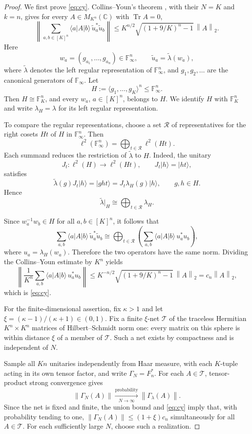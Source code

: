 \documentclass[11pt]{article}
\numberwithin{equation}{section}
\theoremstyle{boldremark}\newtheorem{remark}[theorem]{Remark}
\DeclareMathOperator{\Tr}{Tr}
\newcommand{\C}{\mathbb C}
\newcommand{\F}{\mathbb F}
\newcommand{\M}{M}
\newcommand{\norm}[1]{\left\lVert #1\right\rVert}
\newcommand{\ket}[1]{\lvert #1\rangle}
\newcommand{\bra}[1]{\langle #1\rvert}
\begin{document}
\begin{proof}
We first prove \eqref{eq:cy}. Collins--Youn's theorem
\cite[Theorem~3.3]{CY}, with their $N=K$ and $k=n$, gives
for every $A\in\M_{K^n}(\C)$ with $\Tr A=0$,
\[
 \left\|\sum_{a,b\in[K]^n}\bra a A\ket b\,
 \widetilde u_a^*\widetilde u_b\right\|
 \le K^{n/2}\sqrt{(1+9/K)^n-1}\,\norm A_2.
\]
Here
\[
 w_a=(g_{a_1},\ldots,g_{a_n})\in\F_\infty^n,
 \qquad \widetilde u_a=\widetilde\lambda(w_a),
\]
where $\widetilde\lambda$ denotes the left regular representation
of $\F_\infty^n$, and $g_1,g_2,\ldots$ are the canonical generators
of $\F_\infty$. Let
\[
 H:=\langle g_1,\ldots,g_K\rangle^n\le\F_\infty^n.
\]
Then $H\cong\F_K^n$, and every $w_a$, $a\in[K]^n$, belongs to $H$.
We identify $H$ with $\F_K^n$ and write $\lambda_H=\lambda$ for its
left regular representation.

To compare the regular representations, choose a set $\mathcal R$
of representatives for the right cosets $Ht$ of $H$ in
$\F_\infty^n$. Then
\[
 \ell^2(\F_\infty^n)
 =\bigoplus_{t\in\mathcal R}\ell^2(Ht).
\]
Each summand reduces the restriction of $\widetilde\lambda$ to $H$.
Indeed, the unitary
\[
 J_t:\ell^2(H)\longrightarrow\ell^2(Ht),
 \qquad J_t\ket h=\ket{ht},
\]
satisfies
\[
 \widetilde\lambda(g)J_t\ket h
 =\ket{ght}=J_t\lambda_H(g)\ket h,
 \qquad g,h\in H.
\]
Hence
\[
 \widetilde\lambda|_H
 \cong\bigoplus_{t\in\mathcal R}\lambda_H.
\]

Since $w_a^{-1}w_b\in H$ for all $a,b\in[K]^n$, it follows that
\[
 \sum_{a,b}\bra a A\ket b\,\widetilde u_a^*\widetilde u_b
 \cong\bigoplus_{t\in\mathcal R}
 \left(\sum_{a,b}\bra a A\ket b\,u_a^*u_b\right),
\]
where $u_a=\lambda_H(w_a)$. Therefore the two operators have the
same norm. Dividing the Collins--Youn estimate by $K^n$ yields
\[
 \left\|\frac1{K^n}\sum_{a,b}\bra a A\ket b\,u_a^*u_b\right\|
 \le K^{-n/2}\sqrt{(1+9/K)^n-1}\,\norm A_2
 =c_n\norm A_2,
\]
which is \eqref{eq:cy}.

For the finite-dimensional assertion, fix $\kappa>1$ and let
$\xi=(\kappa-1)/(\kappa+1)\in(0,1)$.
Fix a finite $\xi$-net $\mathcal T$ of the traceless Hermitian
$K^n\times K^n$ matrices of Hilbert--Schmidt norm one: every matrix
on this sphere is within distance $\xi$ of a member of $\mathcal T$.
Such a net exists by compactness and is independent of $N$.

Sample all $Kn$ unitaries independently from Haar measure, with each
$K$-tuple acting in its own tensor factor, and write $\Gamma_N=F_n^*$.
For each $A\in\mathcal T$, tensor-product strong convergence
\cite[Theorem~9.2]{BC} gives
\[
 \norm{\Gamma_N(A)}
 \xrightarrow[N\to\infty]{\mathrm{probability}}
 \norm{\Gamma_\lambda(A)}.
\]
Since the net is fixed and finite, the union bound and
\eqref{eq:cy} imply that, with probability tending to one,
$\norm{\Gamma_N(A)}\le(1+\xi)c_n$ simultaneously for all
$A\in\mathcal T$. For each sufficiently large $N$, choose such a
realization.


\end{proof}
\end{document}
